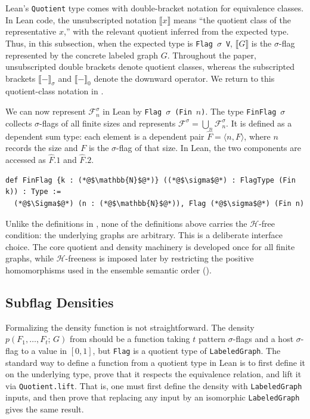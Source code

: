 \documentclass{article}
\newcommand{\den}[2]{p(#1;\,#2)}
\newcommand{\lean}[1]{\texttt{#1}}
\begin{document}
Lean's \lean{Quotient} type comes with double-bracket notation for equivalence
classes.  In
Lean code, the unsubscripted notation \(\llbracket x\rrbracket\)
means ``the quotient class of the representative \(x\),'' with the relevant
quotient inferred from the expected type.  Thus, in this subsection, when the
expected type is \lean{Flag}~\(\sigma\)~\lean{V},
\(\llbracket G\rrbracket\) is the \(\sigma\)-flag represented by the concrete
labeled graph \(G\).  Throughout the paper, unsubscripted double brackets denote
quotient classes, whereas the subscripted brackets
\(\llbracket-\rrbracket_\sigma\) and \(\llbracket-\rrbracket_0\) denote the
downward operator.  We return to this quotient-class notation in
.

We can now represent $\mathcal{F}^\sigma_n$ in Lean by
\lean{Flag}~$\sigma$~\lean{(Fin}~$n$\lean{)}.  The type
\lean{FinFlag}~$\sigma$ collects $\sigma$-flags of all finite sizes and
represents $\mathcal{F}^\sigma = \bigcup_n \mathcal{F}^\sigma_n$.  It is
defined as a dependent sum type: each element is a dependent pair
$\hat F = \langle n, F\rangle$, where $n$ records the size and $F$ is the
$\sigma$-flag of that size.  In Lean, the two components are accessed as
$\hat F.1$ and $\hat F.2$.
\begin{lstlisting}
def FinFlag {k : (*@$\mathbb{N}$@*)} ((*@$\sigma$@*) : FlagType (Fin k)) : Type :=
  (*@$\Sigma$@*) (n : (*@$\mathbb{N}$@*)), Flag (*@$\sigma$@*) (Fin n)
\end{lstlisting}

Unlike the definitions in , none of the definitions above
carries the \(\mathcal{H}\)-free condition: the underlying graphs are
arbitrary.  This is a deliberate interface choice.  The core quotient and
density machinery is developed once for all finite graphs, while
\(\mathcal{H}\)-freeness is imposed later by restricting the positive
homomorphisms used in the ensemble semantic order
().

\subsection{Subflag Densities}
\label{sec:formal-subflag-densities}

Formalizing the density function is not straightforward.  The density
$\den{F_1,\ldots,F_t}{G}$ from  should be a
function taking $t$ pattern $\sigma$-flags and a host $\sigma$-flag to a value in $[0,1]$, but
\lean{Flag} is a quotient type of \lean{LabeledGraph}.  The standard way to
define a function from a quotient type in Lean is to first define it on the
underlying type, prove that it respects the equivalence relation, and lift it
via \lean{Quotient.lift}.  That is, one must first define the density with
\lean{LabeledGraph} inputs, and then prove that replacing any input by an
isomorphic \lean{LabeledGraph} gives the same result.
\end{document}
